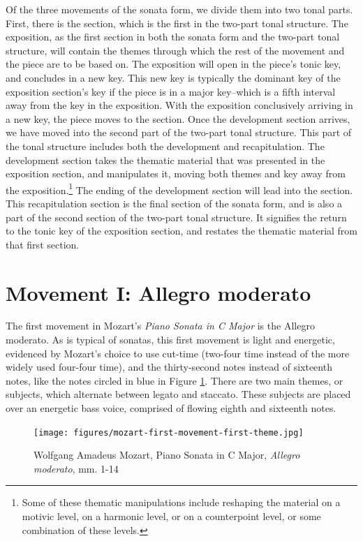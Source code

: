 Of the three movements of the sonata form, we divide them into two tonal parts. First, there is the  section, which is the first in the two-part tonal structure. The exposition, as the first section in both the sonata form and the two-part tonal structure, will contain the themes through which the rest of the movement and the piece are to be based on. The exposition will open in the piece's tonic key, and concludes in a new key. This new key is typically the dominant key of the exposition section's key if the piece is in a major key\autocite{Webster_2001}--which is a fifth interval away from the key in the exposition. With the exposition conclusively arriving in a new key, the piece moves to the  section. Once the development section arrives, we have moved into the second part of the two-part tonal structure. This part of the tonal structure includes both the development and recapitulation\autocite{Webster_2001}. The development section takes the thematic material that was presented in the exposition section, and manipulates it, moving both themes and key away from the exposition.\footnote{Some of these thematic manipulations include reshaping the material on a motivic level, on a harmonic level, or on a counterpoint level, or some combination of these levels.} The ending of the development section will lead into the  section. This recapitulation section is the final section of the sonata form, and is also a part of the second section of the two-part tonal structure. It signifies the return to the tonic key of the exposition section\autocite{Webster_2001}, and restates the thematic material from that first section.

\section{Movement I: Allegro moderato}
The first movement in Mozart's \textit{Piano Sonata in C Major} is the Allegro moderato. As is typical of sonatas, this first movement is light and energetic, evidenced by Mozart's choice to use cut-time (two-four time instead of the more widely used four-four time), and the thirty-second notes instead of sixteenth notes, like the notes circled in blue in Figure \ref{fig:mozart-first-movement-first-theme}\autocite{Henle_1977}. There are two main themes, or subjects, which alternate between legato and staccato. These subjects are placed over an energetic bass voice, comprised of flowing eighth and sixteenth notes.

\begin{figure}
    \centering
    \texttt{[image: figures/mozart-first-movement-first-theme.jpg]}
    \caption{Wolfgang Amadeus Mozart, Piano Sonata in C Major, \textit{Allegro moderato}, mm. 1-14}
    \label{fig:mozart-first-movement-first-theme}
\end{figure}

